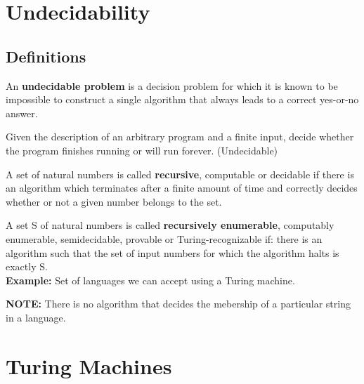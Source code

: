 \documentclass[a4paper,oneside]{book}
\begin{document}
\chapter{Undecidability}
\section{Definitions}
\begin{definition}
An \textbf{undecidable problem} is a decision problem for which it is known to be impossible to construct a single algorithm that always leads to a correct yes-or-no answer.
\end{definition}
\begin{definition}
Given the description of an arbitrary program and a finite input, decide whether the program finishes running or will run forever. (Undecidable)
\end{definition}
\begin{definition}
A set of natural numbers is called \textbf{recursive}, computable or decidable if there is an algorithm which terminates after a finite amount of time and correctly decides whether or not a given number belongs to the set.
\end{definition}
\begin{definition}
A set S of natural numbers is called \textbf{recursively enumerable}, computably enumerable, semidecidable, provable or Turing-recognizable if:
there is an algorithm such that the set of input numbers for which the algorithm halts is exactly S.\\
\textbf{Example:}  Set of languages we can accept using a Turing machine.
\end{definition}
\textbf{NOTE:} There is no algorithm that decides the mebership of a particular string in a language.
\chapter{Turing Machines}
\end{document}
